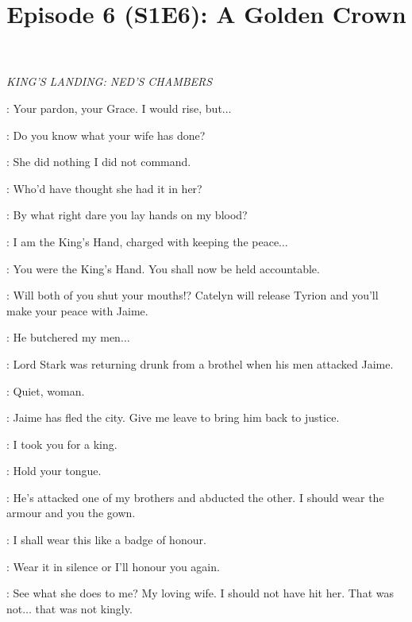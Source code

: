 

\title{Episode 6 (S1E6): A Golden Crown}
\author{}
\date{}
\maketitle




\scene

\textit{KING'S LANDING: NED'S CHAMBERS} 


\NED: Your pardon, your Grace. I would rise, but$\ldots$ 

\CERSEI: Do you know what your wife has done? 

\NED: She did nothing I did not command. 

\ROBERT: Who'd have thought she had it in her? 

\CERSEI: By what right dare you lay hands on my blood? 

\NED: I am the King's Hand, charged with keeping the peace$\ldots$ 

\CERSEI: You were the King's Hand. You shall now be held accountable. 

\ROBERT: Will both of you shut your mouths!? Catelyn will release Tyrion and you'll make your peace with Jaime. 

\NED: He butchered my men$\ldots$ 

\CERSEI: Lord Stark was returning drunk from a brothel when his men attacked Jaime. 

\ROBERT: Quiet, woman. 

\NED: Jaime has fled the city. Give me leave to bring him back to justice. 

\CERSEI: I took you for a king. 

\ROBERT: Hold your tongue. 

\CERSEI: He's attacked one of my brothers and abducted the other. I should wear the armour and you the gown. 


\CERSEI: I shall wear this like a badge of honour. 

\ROBERT: Wear it in silence or I'll honour you again. 


\ROBERT: See what she does to me? My loving wife. I should not have hit her. That was not$\ldots$ that was not kingly. 

